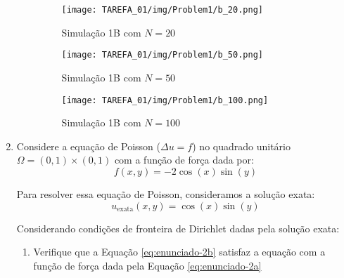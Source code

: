 \documentclass[column,amsmath,amssymb,floatfix]{revtex4}
\begin{document}
\begin{enumerate}
\begin{enumerate}
                \begin{figure}[H]
                    \centering
                    \begin{minipage}{0.32\textwidth}
                        \centering
                        \texttt{[image: TAREFA\_01/img/Problem1/b\_20.png]}
                        \caption{Simulação 1B com $N = 20$}
                    \end{minipage}
                    \hfill
                    \begin{minipage}{0.32\textwidth}
                        \centering
                        \texttt{[image: TAREFA\_01/img/Problem1/b\_50.png]}
                        \caption{Simulação 1B com $N = 50$}
                    \end{minipage}
                    \hfill
                    \begin{minipage}{0.32\textwidth}
                        \centering
                        \texttt{[image: TAREFA\_01/img/Problem1/b\_100.png]}
                        \caption{Simulação 1B com $N = 100$}
                    \end{minipage}
                \end{figure}
            \end{enumerate}

            \item Considere a equação de Poisson ($\Delta u = f$) no quadrado unitário $\Omega = (0, 1) \times (0, 1)$ com a função de força dada por:
            \begin{equation}
                f(x, y) = -2 \cos(x) \sin(y)
                \label{eq:enunciado-2a}
            \end{equation}

            Para resolver essa equação de Poisson, consideramos a solução exata:
            \begin{equation}
                u_{\text{exata}}(x,y) = \cos(x)\sin(y)
                \label{eq:enunciado-2b}
            \end{equation}

            Considerando condições de fronteira de Dirichlet dadas pela solução exata:
            \begin{enumerate}
                \item Verifique que a Equação \eqref{eq:enunciado-2b} satisfaz a equação com a função de força dada pela Equação \eqref{eq:enunciado-2a}


\end{enumerate}
\end{enumerate}
\end{document}
